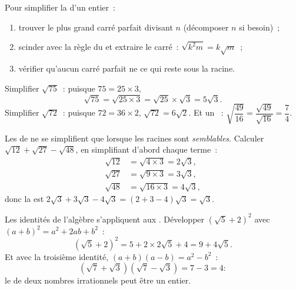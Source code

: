 \begin{method}\label{met:g9:sqrt:simplify}
Pour simplifier la  d'un entier~:
\begin{enumerate}
  \item trouver le plus grand carré parfait divisant $n$ (décomposer
        $n$ si besoin)~;
  \item scinder avec la règle du  et extraire le carré~:
        $\sqrt{k^2 m} = k\sqrt m$~;
  \item vérifier qu'aucun carré parfait ne  ce qui reste sous la
        racine.
\end{enumerate}
\end{method}

\begin{example}\label{ex:g9:sqrt:simplify}
Simplifier $\sqrt{75}$~: puisque $75 = 25 \times 3$,
\[
\sqrt{75} = \sqrt{25 \times 3} = \sqrt{25} \times \sqrt 3 = 5\sqrt3 .
\]
Simplifier $\sqrt{72}$~: puisque $72 = 36 \times 2$,
$\sqrt{72} = 6\sqrt2$. Et un ~:
$\sqrt{\dfrac{49}{16}} = \dfrac{\sqrt{49}}{\sqrt{16}} = \dfrac74$.
\end{example}

\begin{example}\label{ex:g9:sqrt:add}
Les  de  ne se simplifient que lorsque les racines
sont \emph{semblables}. Calculer $\sqrt{12} + \sqrt{27} - \sqrt{48}$, en
simplifiant d'abord chaque terme~:
\begin{align*}
\sqrt{12} &= \sqrt{4 \times 3} = 2\sqrt3, \\
\sqrt{27} &= \sqrt{9 \times 3} = 3\sqrt3, \\
\sqrt{48} &= \sqrt{16 \times 3} = 4\sqrt3,
\end{align*}
donc la  est $2\sqrt3 + 3\sqrt3 - 4\sqrt3 = (2 + 3 - 4)\sqrt3 =
\sqrt3$.
\end{example}

\begin{example}\label{ex:g9:sqrt:expand}
Les identités de l'algèbre s'appliquent aux . Développer
$\left(\sqrt5 + 2\right)^2$ avec $(a+b)^2 = a^2 + 2ab + b^2$~:
\[
\left(\sqrt5 + 2\right)^2 = 5 + 2 \times 2\sqrt5 + 4 = 9 + 4\sqrt5 .
\]
Et avec la troisième identité, $(a+b)(a-b) = a^2 - b^2$~:
\[
\left(\sqrt7 + \sqrt3\right)\left(\sqrt7 - \sqrt3\right) = 7 - 3 = 4 :
\]
le  de deux nombres irrationnels peut être un entier.
\end{example}

